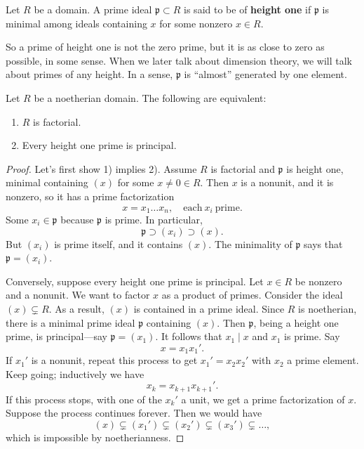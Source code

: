\begin{definition} 
Let $R$ be a domain. A prime ideal $\mathfrak{p} \subset R$ is said to be of
\textbf{height one} if $\mathfrak{p}$ is minimal among ideals
containing $x$ for some nonzero $x \in R$. 
\end{definition} 
So a prime of height one is not the zero prime, but it is as close to zero as
possible, in some sense. When we later talk about dimension theory, we will
talk about primes of any height. In a sense, $\mathfrak{p}$ is ``almost''
generated by one element.

\begin{theorem} 
Let $R$ be a noetherian domain. The following are equivalent:
\begin{enumerate}
\item $R$ is factorial. 
\item Every height one prime is principal.
\end{enumerate}
\end{theorem} 
\begin{proof} 
Let's first show 1) implies 2). Assume $R$ is factorial and $\mathfrak{p}$ is
height one, minimal containing $(x)$ for some $x \neq 0 \in R$. 
Then $x$ is a nonunit, and it is nonzero, so it has a prime factorization
\[ x = x_1 \dots x_n, \quad \mathrm{each \ } x_i \ \mathrm{prime}.  \]
Some $x_i \in \mathfrak{p}$ because $\mathfrak{p}$ is prime. In particular,
\[ \mathfrak{p} \supset (x_i) \supset (x).  \]
But $(x_i)$ is prime itself, and it contains $(x)$. The minimality of
$\mathfrak{p}$ says that $\mathfrak{p}  = (x_i)$. 

Conversely, suppose every height one prime is principal. Let $x \in R$ be
nonzero and a nonunit. We want
to factor $x$ as a product of primes. 
Consider the ideal $(x) \subsetneq R$. As a result, $(x)$ is contained in a
prime ideal. Since $R$ is noetherian, there is a minimal prime ideal
$\mathfrak{p}$ containing $(x)$.  Then $\mathfrak{p}$, being a height one
prime, is principal---say $\mathfrak{p}=(x_1)$. It follows that $x_1 \mid x$
and $x_1$ is prime.
Say 
\[ x = x_1 x_1'.  \]
If $x_1'$ is a nonunit, repeat this process to get $x_1' = x_2 x_2'$ with $x_2$ a prime element. 
Keep going; inductively we have
\[ x_k = x_{k+1}x_{k+1}'.  \]
If this process stops, with one of the $x_k'$  a  unit, we get a prime
factorization of $x$. Suppose the process
continues forever. Then we would have
\[ (x) \subsetneq (x_1') \subsetneq (x_2') \subsetneq (x_3') \subsetneq \dots,  \]
which is impossible by noetherianness. 
\end{proof} 

